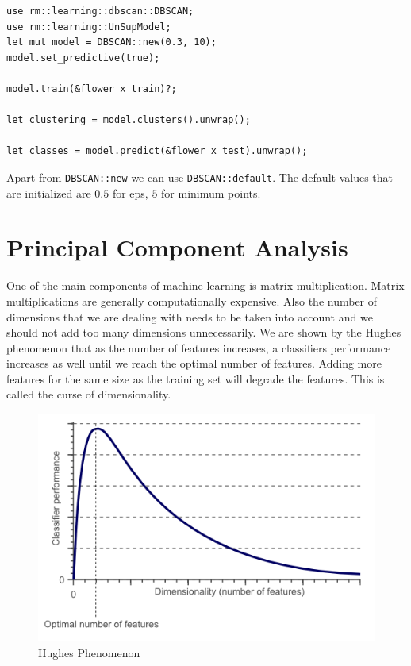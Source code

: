 \documentclass{book}
\begin{document}
\begin{lstlisting}[caption={rusty\_machine\_unsupervised}]
use rm::learning::dbscan::DBSCAN;
use rm::learning::UnSupModel;
let mut model = DBSCAN::new(0.3, 10);
model.set_predictive(true);

model.train(&flower_x_train)?;

let clustering = model.clusters().unwrap();

let classes = model.predict(&flower_x_test).unwrap();
\end{lstlisting}

Apart from \lstinline{DBSCAN::new} we can use \lstinline{DBSCAN::default}. The default values that are initialized are $0.5$ for eps, $5$ for minimum points.

\label{sec:dbscan}

\section{Principal Component Analysis}%
One of the main components of machine learning is matrix multiplication. Matrix multiplications are generally computationally expensive\cite{UL:4}. Also the number of dimensions that we are dealing with needs to be taken into account and we should not add too many dimensions unnecessarily. We are shown by the Hughes phenomenon that as the number of features increases, a classifiers performance increases as well until we reach the optimal number of features. Adding more features for the same size as the training set will degrade the features. This is called the curse of dimensionality\cite{UL:5}.

\begin{figure}[htpb]
	\centering
	\includegraphics[width=0.8\linewidth]{HughesPhenomenon.png}
	\caption{Hughes Phenomenon}
	\label{fig:Hughes_Phenomenon}
\end{figure}
\end{document}
